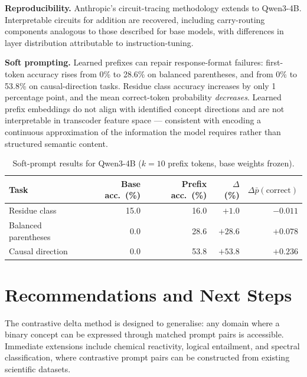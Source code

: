 \documentclass[11pt,a4paper]{article}
\begin{document}
\textbf{Reproducibility.}\enspace
Anthropic's circuit-tracing methodology extends to Qwen3-4B. Interpretable circuits for addition are recovered, including carry-routing components analogous to those described for base models, with differences in layer distribution attributable to instruction-tuning.

\textbf{Soft prompting.}\enspace
Learned prefixes can repair response-format failures: first-token accuracy rises from 0\% to 28.6\% on balanced parentheses, and from 0\% to 53.8\% on causal-direction tasks. Residue class accuracy increases by only 1 percentage point, and the mean correct-token probability \emph{decreases}. Learned prefix embeddings do not align with identified concept directions and are not interpretable in transcoder feature space — consistent with encoding a continuous approximation of the information the model requires rather than structured semantic content.

\begin{table}[h]
\centering
\small
\setlength{\tabcolsep}{8pt}
\begin{tabular}{@{}lrrrr@{}}
\toprule
Task & Base acc.\ (\%) & Prefix acc.\ (\%) & $\Delta$ (\%) & $\Delta\bar{p}(\text{correct})$ \\
\midrule
Residue class        & 15.0 & 16.0 & $+1.0$  & $-0.011$ \\
Balanced parentheses &  0.0 & 28.6 & $+28.6$ & $+0.078$ \\
Causal direction     &  0.0 & 53.8 & $+53.8$ & $+0.236$ \\
\bottomrule
\end{tabular}
\caption{\small Soft-prompt results for Qwen3-4B ($k=10$ prefix tokens, base weights frozen).}
\label{tab:sp_summary}
\end{table}

\section{Recommendations and Next Steps}

The contrastive delta method is designed to generalise: any domain where a binary concept can be expressed through matched prompt pairs is accessible. Immediate extensions include chemical reactivity, logical entailment, and spectral classification, where contrastive prompt pairs can be constructed from existing scientific datasets.
\end{document}
